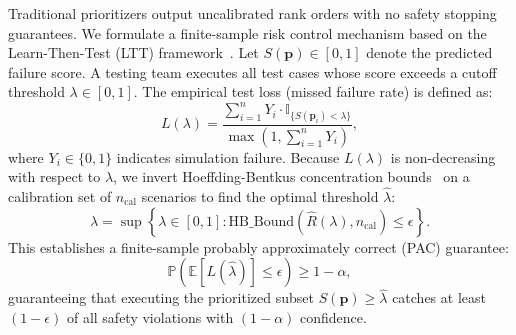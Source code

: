 Traditional prioritizers output uncalibrated rank orders with no safety stopping guarantees.
We formulate a finite-sample risk control mechanism based on the Learn-Then-Test (LTT) framework~\cite{ltt}.
Let $S(\mathbf{p}) \in [0, 1]$ denote the predicted failure score.
A testing team executes all test cases whose score exceeds a cutoff threshold $\lambda \in [0, 1]$.
The empirical test loss (missed failure rate) is defined as:
\begin{equation}
L(\lambda) = \frac{\sum_{i=1}^n Y_i \cdot \mathbb{I}_{\{S(\mathbf{p}_i) < \lambda\}}}{\max(1, \sum_{i=1}^n Y_i)},
\end{equation}
where $Y_i \in \{0, 1\}$ indicates simulation failure.
Because $L(\lambda)$ is non-decreasing with respect to $\lambda$, we invert Hoeffding-Bentkus concentration bounds~\cite{bentkus} on a calibration set of $n_{\mathrm{cal}}$ scenarios to find the optimal threshold $\hat{\lambda}$:
\begin{equation}
\hat{\lambda} = \sup \left\{ \lambda \in [0, 1] : \mathrm{HB\_Bound}\left(\widehat{R}(\lambda), n_{\mathrm{cal}}\right) \le \epsilon \right\}.
\end{equation}
This establishes a finite-sample probably approximately correct (PAC) guarantee:
\begin{equation}
\mathbb{P}\left(\mathbb{E}[L(\hat{\lambda})] \le \epsilon\right) \ge 1 - \alpha,
\end{equation}
guaranteeing that executing the prioritized subset $S(\mathbf{p}) \ge \hat{\lambda}$ catches at least $(1 - \epsilon)$ of all safety violations with $(1 - \alpha)$ confidence.
